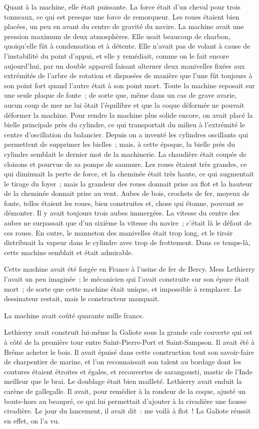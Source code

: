 \documentclass[french,twoside]{book} %
\begin{document}
Quant à la machine, elle était puissante. La force était d’un cheval pour trois tonneaux, ce qui est presque une force de remorqueur. Les roues étaient bien placées, un peu en avant du centre de gravité du navire. La machine avait une pression maximum de deux atmosphères. Elle usait beaucoup de charbon, quoiqu’elle fût à condensation et à détente. Elle n’avait pas de volant à cause de l’instabilité du point d’appui, et elle y remédiait, comme on le fait encore aujourd’hui, par un double appareil faisant alterner deux manivelles fixées aux extrémités de l’arbre de rotation et disposées de manière que l’une fût toujours à son point fort quand l’autre était à son point mort. Toute la machine reposait sur une seule plaque de fonte ; de  sorte que, même dans un cas de grave avarie, aucun coup de mer ne lui ôtait l’équilibre et que la coque déformée ne pouvait déformer la machine. Pour rendre la machine plus solide encore, on avait placé la bielle principale près du cylindre, ce qui transportait du milieu à l’extrémité le centre d’oscillation du balancier. Depuis on a inventé les cylindres oscillants qui permettent de supprimer les bielles ; mais, à cette époque, la bielle près du cylindre semblait le dernier mot de la machinerie. La chaudière était coupée de cloisons et pourvue de sa pompe de saumure. Les roues étaient très grandes, ce qui diminuait la perte de force, et la cheminée était très haute, ce qui augmentait le tirage du foyer ; mais la grandeur des roues donnait prise au flot et la hauteur de la cheminée donnait prise au vent. Aubes de bois, crochets de fer, moyeux de fonte, telles étaient les roues, bien construites et, chose qui étonne, pouvant se démonter. Il y avait toujours trois aubes immergées. La vitesse du centre des aubes ne surpassait que d’un sixième la vitesse du navire ; c’était là le défaut de ces roues. En outre, le manneton des manivelles était trop long, et le tiroir distribuait la vapeur dans le cylindre avec trop de frottement. Dans ce temps-là, cette machine semblait et était admirable.\par
Cette machine avait été forgée en France à l’usine de fer de Bercy. Mess Lethierry l’avait un peu imaginée ; le mécanicien qui l’avait construite sur son épure était mort ; de sorte que cette machine était unique, et impossible à remplacer. Le dessinateur restait, mais le constructeur manquait.\par
 La machine avait coûté quarante mille francs.\par
Lethierry avait construit lui-même la Galiote sous la grande cale couverte qui est à côté de la première tour entre Saint-Pierre-Port et Saint-Sampson. Il avait été à Brême acheter le bois. Il avait épuisé dans cette construction tout son savoir-faire de charpentier de marine, et l’on reconnaissait son talent au bordage dont les coutures étaient étroites et égales, et recouvertes de sarangousti, mastic de l’Inde meilleur que le brai. Le doublage était bien mailleté. Lethierry avait enduit la carène de gallegalle. Il avait, pour remédier à la rondeur de la coque, ajusté un boute-hors au beaupré, ce qui lui permettait d’ajouter à la civadière une fausse civadière. Le jour du lancement, il avait dit : me voilà à flot ! La Galiote réussit en effet, on l’a vu.\par
\end{document}
